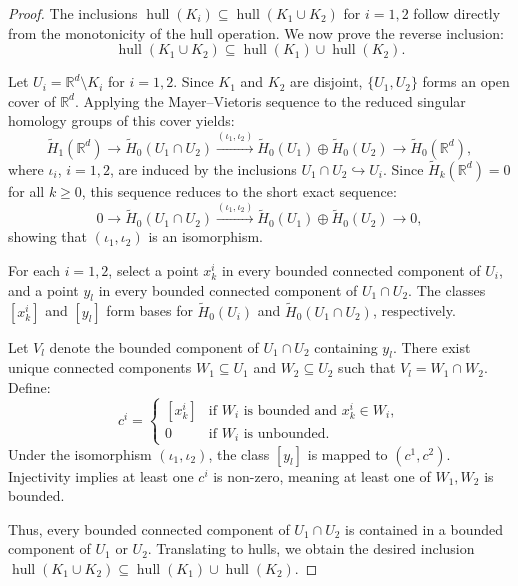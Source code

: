 \documentclass[12pt]{paper}
\numberwithin{equation}{section}
\theoremstyle{plain}
\theoremstyle{definition}
\newcommand{\Rd}{\mathbb{R}^{d}}
\renewcommand{\tilde}{\widetilde}
\DeclareMathOperator{\hull}{\mathrm{hull}}
\begin{document}
\begin{proof}
  The inclusions \(\hull(K_{i}) \subseteq \hull(K_{1} \cup K_{2})\) for \(i = 1,2\) follow directly
  from the monotonicity of the hull operation. We now prove the reverse inclusion:
  \[ \hull(K_{1} \cup K_{2}) \subseteq \hull(K_{1}) \cup \hull(K_{2}). \]

  Let \(U_{i} = \Rd \setminus K_{i}\) for \(i = 1,2\). Since \(K_{1}\) and \(K_{2}\) are
  disjoint, \(\{U_{1}, U_{2}\}\) forms an open cover of \(\Rd\). Applying the
  Mayer--Vietoris sequence to the reduced singular homology groups of this cover yields:
  \[
    \tilde{H}_{1}(\Rd) \to \tilde{H}_{0}(U_{1} \cap U_{2}) \xrightarrow{(\iota_{1},
      \iota_{2})} \tilde{H}_{0}(U_{1}) \oplus \tilde{H}_{0}(U_{2}) \to \tilde{H}_{0}(\Rd),
  \]
  where \(\iota_{i}\), \(i=1,2\), are induced by the
  inclusions \(U_{1} \cap U_{2} \hookrightarrow U_{i}\).
  Since \(\tilde{H}_{k}(\Rd) = 0\) for all \(k \ge 0\), this sequence reduces to the short
  exact sequence:
  \[
    0 \to \tilde{H}_{0}(U_{1} \cap U_{2}) \xrightarrow{(\iota_{1}, \iota_{2})} \tilde{H}_{0}(U_{1})
    \oplus \tilde{H}_{0}(U_{2}) \to 0,
  \]
  showing that \((\iota_{1},\iota_{2})\) is an isomorphism.

  For each \(i = 1,2\), select a point \(x^{i}_{k}\) in every bounded connected component of
  \(U_{i}\), and a point \(y_{l}\) in every bounded connected component of \(U_{1} \cap U_{2}\). The
  classes \([x^{i}_{k}]\) and \([y_{l}]\) form bases for \(\tilde{H}_{0}(U_{i})\) and
  \(\tilde{H}_{0}(U_{1}\cap U_{2})\), respectively.

  Let \(V_{l}\) denote the bounded component of \(U_{1} \cap U_{2}\) containing \(y_{l}\). There
  exist unique connected components \(W_{1} \subseteq U_{1}\) and \(W_{2} \subseteq U_{2}\) such
  that \(V_{l} = W_{1} \cap W_{2}\). Define:
  \[
    c^{i} =
    \begin{cases}
      [x^{i}_{k}] & \text{if } W_{i} \text{ is bounded and } x^{i}_{k} \in W_{i},\\[4pt]
      0 & \text{if } W_{i} \text{ is unbounded}.
    \end{cases}
  \]
  Under the isomorphism \((\iota_{1},\iota_{2})\), the class \([y_{l}]\) is mapped to
  \((c^{1}, c^{2})\). Injectivity implies at least one \(c^{i}\) is non-zero, meaning at least one
  of \(W_{1}, W_{2}\) is bounded.

  Thus, every bounded connected component of \(U_{1} \cap U_{2}\) is contained in a bounded
  component of \(U_{1}\) or \(U_{2}\). Translating to hulls, we obtain the desired inclusion
  \(\hull(K_{1} \cup K_{2}) \subseteq \hull(K_{1}) \cup \hull(K_{2})\).
\end{proof}
\end{document}
